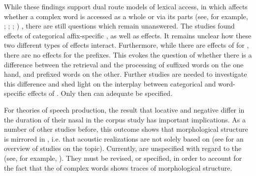 While these findings support dual route models of lexical access, in which  affects whether a complex word is accessed as a whole or via its parts (see, for example, \citealt{Frauenfelder.1992}; \citealt{Schreuder.2015}; \citealt{deVaan.2011}; \citealt{Caselli.2016})
, there are still questions which remain unanswered. The studies found effects of categorical affix-specific , as well as  effects. It remains unclear how these two different types of  effects interact. Furthermore, while there are effects of  for , there are no effects for the prefixes. This evokes the question of whether there is a difference between the retrieval and the processing of suffixed words on the one hand, and prefixed words on the other. Further studies are needed to investigate this difference and shed light on the interplay between categorical and word-specific effects of . Only then can adequate  be specified. 



For theories of speech production, the result that locative  and negative  differ in the duration of their nasal in the corpus study has important implications. 
As a number of other studies before, this outcome shows that morphological structure is mirrored in , i.e. that  acoustic realizations are not solely based on  (see  for an overview of studies on the topic). Currently,  are unspecified with regard to the  (see, for example, \citealt{Dell.1986,Johnson.1997b,Levelt.1999b,Bybee.2002,Pierrehumbert.2001,Pierrehumbert.2002}). They must be revised, or specified, in order to account for the fact that the  of complex words shows traces of morphological structure.

